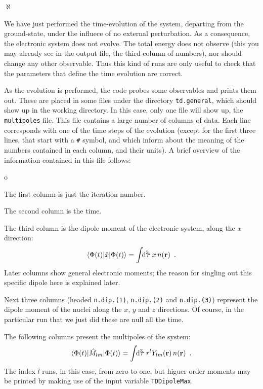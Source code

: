 \documentclass[10pt,a4paper,twoside]{article}
\newenvironment{mylist}
{
\begin{list}{$\aleph$}
{
\setlength{\parskip}{0pt}
\setlength{\topsep}{0pt}
\setlength{\partopsep}{0pt}
\setlength{\itemsep}{0pt}
\setlength{\parsep}{0pt}
}
}
{
\end{list}
}
\begin{document}
\begin{mylist}
\item We have just performed the time-evolution of the system, departing from
the ground-state, under the influece of no external perturbation. As a consequence,
the electronic system does not evolve. The total energy does not observe (this you
may already see in the output file, the third column of numbers), nor should
change any other observable. Thus this kind of runs are only useful to check that
the parameters that define the time evolution are correct.
\item As the evolution is performed, the code probes some observables and prints
them out. These are placed in some files under the directory {\tt td.general}, which
should show up in the working directory. In this case, only one file will show
up, the {\tt multipoles} file. This file contains a large number of columns of data. Each
line corresponds with one of the time steps of the evolution (except for the first
three lines, that start with a {\tt \#} symbol, and which inform about the
meaning of the numbers contained in each column, and their units). A brief overview
of the information contained in this file follows:
\begin{list}{o}
{
\setlength{\parskip}{0pt}
\setlength{\topsep}{0pt}
\setlength{\partopsep}{0pt}
\setlength{\itemsep}{0pt}
\setlength{\parsep}{0pt}
}
\item The first column is just the iteration number.
\item The second column is the time.
\item The third column is the dipole moment of the electronic system, along the $x$ direction:
\begin{equation}\nonumber
\langle \Phi (t) \vert \hat{x} \vert \Phi(t)\rangle = 
\int\!\!{\rm d}^3\!\!r\; x\,n({\bf r})~\,.
\end{equation}
Later columns show general electronic moments; the reason for singling out this specific
dipole here is explained later.
\item Next three columns (headed {\tt n.dip.(1)}, {\tt n.dip.(2)} and {\tt n.dip.(3)}) represent
the dipole moment of the nuclei along the $x$, $y$ and $z$ directions. Of course, in the particular
run that we just did these are null all the time.
\item The following columns present the multipoles of the system:
\begin{equation}\nonumber
\langle \Phi (t) \vert \hat{M}_{lm} \vert \Phi(t)\rangle = 
\int\!\!{\rm d}^3\!\!r\; r^lY_{lm}({\bf r})\,n({\bf r})~\,.
\end{equation}
The index $l$ runs, in this case, from zero to one, but higuer order moments may
be printed by making use of the input variable {\tt TDDipoleMax}.


\end{list}
\end{mylist}
\end{document}
